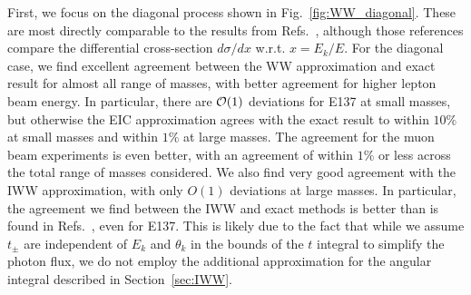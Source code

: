First, we focus on the diagonal process shown in Fig.~\ref{fig:WW_diagonal}. These are most directly comparable to the results from Refs.~\cite{Liu:2016mqv,Liu:2017htz,Chen:2017awl}, although those references compare the differential cross-section $d\sigma/dx$ w.r.t. $x = E_k/E$. For the diagonal case, we find excellent agreement between the WW approximation and exact result for almost all range of masses, with better agreement for higher lepton beam energy. In particular, there are ${\cal O}(1)$ deviations for E137 at small masses, but otherwise the EIC approximation agrees with the exact result to within $10\%$ at small masses and within $1\%$ at large masses. The agreement for the muon beam experiments is even better, with an agreement of within $1\%$ or less across the total range of masses considered. We also find very good agreement with the IWW approximation, with only $O(1)$ deviations at large masses. In particular, the agreement we find between the IWW and exact methods is better than is found in Refs.~\cite{Liu:2016mqv,Liu:2017htz}, even for E137. This is likely due to the fact that while we assume $t_{\pm}$ are independent of $E_k$ and $\theta_k$ in the bounds of the $t$ integral to simplify the photon flux, we do not employ the additional approximation for the angular integral described in Section~\ref{sec:IWW}. 
\clearpage
